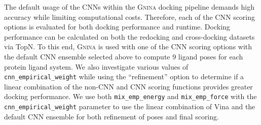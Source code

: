 \documentclass[linenumbers,doublespacing]{bmcart}
\begin{document}
The default usage of the CNNs within the \textsc{Gnina} docking pipeline demands high accuracy while limiting computational costs. Therefore, each of the CNN scoring options is evaluated for both docking performance and runtime. Docking performance can be calculated on both the redocking and cross-docking datasets via TopN. To this end, \textsc{Gnina} is used with one of the CNN scoring options with the default CNN ensemble selected above to compute 9 ligand poses for each protein ligand system. We also investigate various values of \texttt{cnn\_empirical\_weight} while using the ``refinement'' option to determine if a linear combination of the non-CNN and CNN scoring functions provides greater docking performance. We use both \texttt{mix\_emp\_energy} and \texttt{mix\_emp\_force} with the \texttt{cnn\_empirical\_weight} parameter to use the linear combination of Vina and the default CNN ensemble for both refinement of poses and final scoring.
\end{document}
